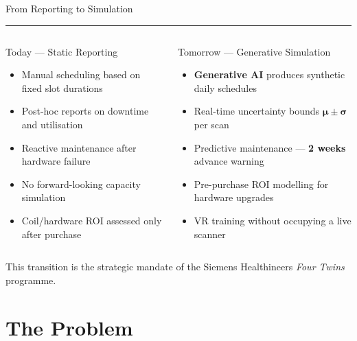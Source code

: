 \documentclass[aspectratio=169,12pt]{beamer}
\newcommand{\tealsep}{\vspace{1pt}\textcolor{SiemensTeal}{\rule{\linewidth}{1pt}}\vspace{4pt}}
\begin{document}
\begin{frame}[shrink=15]{From Reporting to Simulation}
\tealsep
\begin{columns}[T]
\begin{block}{Today — Static Reporting}
\begin{itemize}\setlength\itemsep{4pt}
  \item Manual scheduling based on fixed slot durations
  \item Post-hoc reports on downtime and utilisation
  \item Reactive maintenance after hardware failure
  \item No forward-looking capacity simulation
  \item Coil/hardware ROI assessed only after purchase
\end{itemize}
\end{block}

\begin{exampleblock}{Tomorrow — Generative Simulation}
\begin{itemize}\setlength\itemsep{4pt}
  \item \textbf{Generative AI} produces synthetic daily schedules
  \item Real-time uncertainty bounds $\boldsymbol{\mu \pm \sigma}$ per scan
  \item Predictive maintenance — \textbf{2 weeks} advance warning
  \item Pre-purchase ROI modelling for hardware upgrades
  \item VR training without occupying a live scanner
\end{itemize}
\end{exampleblock}
\end{columns}
\vspace{6pt}
\textcolor{SiemensMuted}{\footnotesize This transition is the strategic mandate of the Siemens Healthineers \emph{Four Twins} programme.}
\end{frame}

\section{The Problem}
\end{document}
